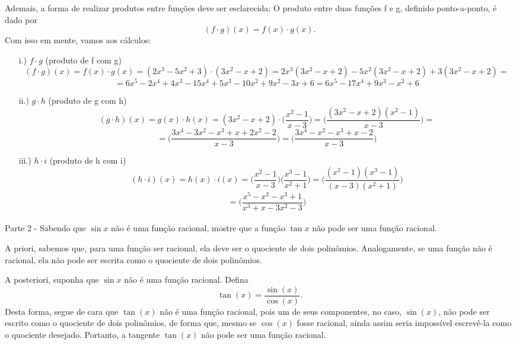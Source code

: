 \documentclass[Calculus1/exercícios_de_cálculo.tex]{subfiles}
\begin{document}
\begin{sol*}
	Ademais, a forma de realizar produtos entre funções deve ser esclarecida: O produto entre duas funções f e g, definido ponto-a-ponto, é dado por
	$$
		(f\cdot{g})(x) = f(x) \cdot{g(x)}.
	$$
	Com isso em mente, vamos aos cálculos:
	\begin{itemize}
		\item[i.)] $f\cdot{g}$ (produto de f com g)
		      $$
			      (f \cdot{g})(x) = f(x)\cdot{g(x)} = (2x^3 - 5x^2 + 3)\cdot(3x^2 - x + 2) = 2x^3(3x^2 - x + 2) - 5x^2 (3x^2 - x + 2) + 3(3x^2 - x + 2) =
		      $$
		      $$
			      = 6x^5 - 2x^4 + 4x^3 - 15x^4 + 5x^3 - 10x^2 + 9x^2 - 3x + 6 = 6x^5 - 17x^4 + 9x^3 - x^2 + 6
		      $$
		\item[ii.)]$g\cdot{h}$  (produto de g com h)
		      $$
			      (g\cdot{h})(x) = g(x)\cdot{h(x)} = (3x^2 - x + 2)\cdot\biggl(\frac{x^2 - 1}{x - 3}\biggr) = \biggl(\frac{(3x^2 - x + 2)(x^2 - 1)}{x - 3}\biggr) =
		      $$
		      $$
			      = \biggl(\frac{3x^4 - 3x^2 - x^3 + x + 2x^2 - 2}{x - 3}\biggr) = \biggl(\frac{3x^4 - x^2 - x^3 + x - 2}{x - 3}\biggr)
		      $$
		\item[iii.)]$h\cdot{i}$ (produto de h com i)
		      $$
			      (h\cdot{i})(x) = h(x)\cdot{i(x)} = \biggl(\frac{x^2 - 1}{x - 3}\biggr)\biggl(\frac{x^3 - 1}{x^2 + 1}\biggr) = \biggl(\frac{(x^2 - 1)(x^3 - 1)}{(x - 3)(x^2 + 1)}\biggr)
		      $$
		      $$
			      = \biggl(\frac{x^5 - x^2 -x^3 + 1}{x^3 + x - 3x^2 - 3}\biggr)
		      $$
	\end{itemize}
	\qedsymbol
\end{sol*}

\paragraph{}Parte 2 - Sabendo que $\sin{x}$ não é uma função racional, mostre que a funç\~ao $\tan{x}$ n\~ao pode ser uma funç\~ao racional.
\begin{proof*}
	A priori, sabemos que, para uma função ser racional, ela deve ser o quociente de dois polinômios. Analogamente, se uma função n\~ao é racional, ela n\~ao pode ser escrita como o quociente de dois polinômios.

	A posteriori, suponha que $\sin{x}$ não é uma função racional. Defina
	$$
		\tan(x) = \frac{\sin(x)}{\cos(x)}.
	$$
	Desta forma, segue de cara que $\tan(x)$ não é uma função racional, pois um de seus componentes, no caso, $\sin(x)$, n\~ao pode ser escrito como o quociente de dois polinômios, de forma que, mesmo se $\cos(x)$ fosse racional, ainda assim seria impossível escrevê-la como o quociente desejado. Portanto, a tangente $\tan(x)$ n\~ao pode ser uma funç\~ao racional.
	\qedsymbol
\end{proof*}
\end{document}
